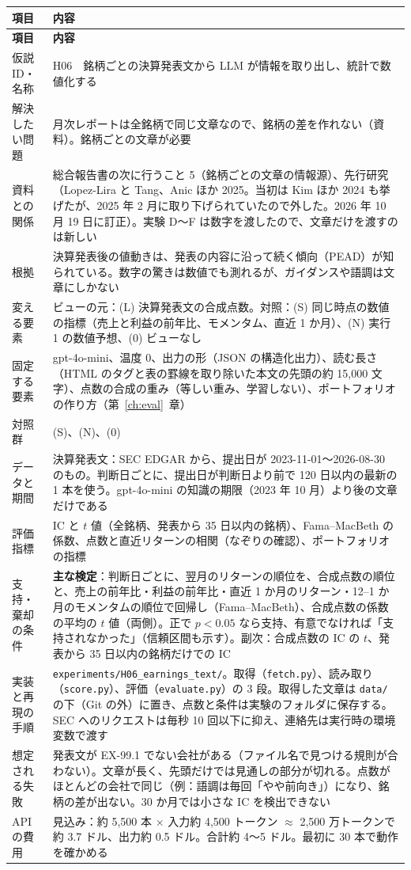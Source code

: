 \documentclass[xelatex,ja=standard,jafont=haranoaji,a4paper,10pt,openany]{bxjsreport}
\newcommand{\code}[1]{\texttt{#1}}
\newcommand{\chapref}[1]{第~\ref{#1}~章}
\newenvironment{plan}{\small\begin{longtable}{p{3.3cm}p{11.6cm}}\toprule\textbf{項目} & \textbf{内容} \\\midrule\endfirsthead
\toprule\textbf{項目} & \textbf{内容} \\\midrule\endhead\bottomrule\endfoot}{\end{longtable}}
\begin{document}
\begin{plan}
仮説 ID・名称 & H06　銘柄ごとの決算発表文から LLM が情報を取り出し、統計で数値化する \\
解決したい問題 & 月次レポートは全銘柄で同じ文章なので、銘柄の差を作れない（資料）。銘柄ごとの文章が必要 \\
資料との関係 & 総合報告書の次に行うこと 5（銘柄ごとの文章の情報源）、先行研究（Lopez-Lira と Tang、Anic ほか 2025。当初は Kim ほか 2024 も挙げたが、2025 年 2 月に取り下げられていたので外した。2026 年 10 月 19 日に訂正）。実験 D〜F は数字を渡したので、文章だけを渡すのは新しい \\
根拠 & 決算発表後の値動きは、発表の内容に沿って続く傾向（PEAD）が知られている。数字の驚きは数値でも測れるが、ガイダンスや語調は文章にしかない \\
変える要素 & ビューの元：(L) 決算発表文の合成点数。対照：(S) 同じ時点の数値の指標（売上と利益の前年比、モメンタム、直近 1 か月）、(N) 実行 1 の数値予想、(0) ビューなし \\
固定する要素 & gpt-4o-mini、温度 0、出力の形（JSON の構造化出力）、読む長さ（HTML のタグと表の罫線を取り除いた本文の先頭の約 15,000 文字）、点数の合成の重み（等しい重み、学習しない）、ポートフォリオの作り方（\chapref{ch:eval}） \\
対照群 & (S)、(N)、(0) \\
データと期間 & 決算発表文：SEC EDGAR から、提出日が 2023-11-01〜2026-08-30 のもの。判断日ごとに、提出日が判断日より前で 120 日以内の最新の 1 本を使う。gpt-4o-mini の知識の期限（2023 年 10 月）より後の文章だけである \\
評価指標 & IC と $t$ 値（全銘柄、発表から 35 日以内の銘柄）、Fama--MacBeth の係数、点数と直近リターンの相関（なぞりの確認）、ポートフォリオの指標 \\
支持・棄却の条件 & \textbf{主な検定}：判断日ごとに、翌月のリターンの順位を、合成点数の順位と、売上の前年比・利益の前年比・直近 1 か月のリターン・12--1 か月のモメンタムの順位で回帰し（Fama--MacBeth）、合成点数の係数の平均の $t$ 値（両側）。正で $p<0.05$ なら支持、有意でなければ「支持されなかった」（信頼区間も示す）。副次：合成点数の IC の $t$、発表から 35 日以内の銘柄だけでの IC \\
実装と再現の手順 & \code{experiments/H06\_earnings\_text/}。取得（\code{fetch.py}）、読み取り（\code{score.py}）、評価（\code{evaluate.py}）の 3 段。取得した文章は \code{data/} の下（Git の外）に置き、点数と条件は実験のフォルダに保存する。SEC へのリクエストは毎秒 10 回以下に抑え、連絡先は実行時の環境変数で渡す \\
想定される失敗 & 発表文が EX-99.1 でない会社がある（ファイル名で見つける規則が合わない）。文章が長く、先頭だけでは見通しの部分が切れる。点数がほとんどの会社で同じ（例：語調は毎回「やや前向き」）になり、銘柄の差が出ない。30 か月では小さな IC を検出できない \\
API の費用 & 見込み：約 5,500 本 $\times$ 入力約 4,500 トークン $\approx$ 2,500 万トークンで約 3.7 ドル、出力約 0.5 ドル。合計約 4〜5 ドル。最初に 30 本で動作を確かめる \\
\end{plan}
\end{document}
